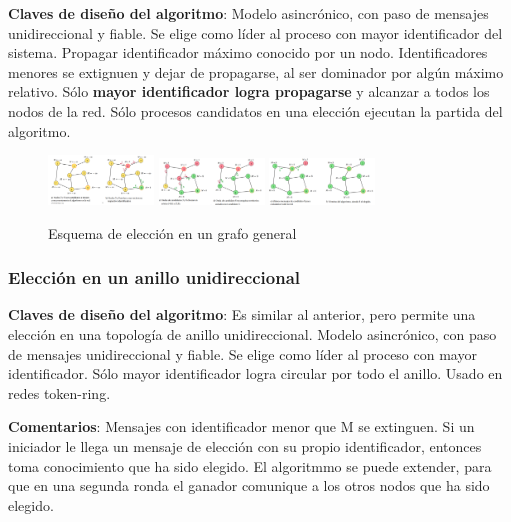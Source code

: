 \textbf{Claves de diseño del algoritmo}: Modelo asincrónico, con paso de mensajes unidireccional y fiable. Se elige como líder al proceso con mayor identificador del sistema. Propagar identificador máximo conocido por un nodo. Identificadores menores se extignuen y dejar de propagarse, al ser dominador por algún máximo relativo. Sólo \textbf{mayor identificador logra propagarse} y alcanzar a todos los nodos de la red. Sólo procesos candidatos en una elección ejecutan la partida del algoritmo.

\begin{figure}[H]
    \centering
    \includegraphics[width=0.25\textwidth]{img/GG_1.png}
    \includegraphics[width=0.25\textwidth]{img/GG_2.png}
    \includegraphics[width=0.25\textwidth]{img/GG_3.png}
    \caption{Esquema de elección en un grafo general}
\end{figure}

\subsubsection{Elección en un anillo unidireccional} 

\textbf{Claves de diseño del algoritmo}: Es similar al anterior, pero permite una elección en una topología de anillo unidireccional. Modelo asincrónico, con paso de mensajes unidireccional y fiable. Se elige como líder al proceso con mayor identificador. Sólo mayor identificador logra circular por todo el anillo. Usado en redes token-ring.

\textbf{Comentarios}: Mensajes con identificador menor que M se extinguen. Si un iniciador le llega un mensaje de elección con su propio identificador, entonces toma conocimiento que ha sido elegido. El algoritmmo se puede extender, para que en una segunda ronda el ganador comunique a los otros nodos que ha sido elegido.


